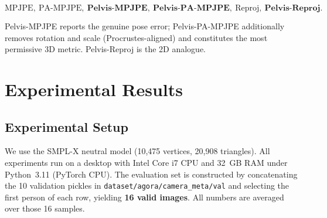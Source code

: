\documentclass[conference]{IEEEtran}
\begin{document}
\[
\text{MPJPE},\ \text{PA-MPJPE},\ \textbf{Pelvis-MPJPE},\ \textbf{Pelvis-PA-MPJPE},\ \text{Reproj},\ \textbf{Pelvis-Reproj}.
\]

Pelvis-MPJPE reports the genuine pose error; Pelvis-PA-MPJPE additionally removes rotation and scale (Procrustes-aligned) and constitutes the most permissive 3D metric. Pelvis-Reproj is the 2D analogue.

\section{Experimental Results}
\label{sec:experiments}

\subsection{Experimental Setup}
We use the SMPL-X neutral model (10,475 vertices, 20,908 triangles). All experiments run on a desktop with Intel Core i7 CPU and 32~GB RAM under Python~3.11 (PyTorch CPU). The evaluation set is constructed by concatenating the 10 validation pickles in \texttt{dataset/agora/camera\_meta/val} and selecting the first person of each row, yielding \textbf{16 valid images}. All numbers are averaged over those 16 samples.
\end{document}
